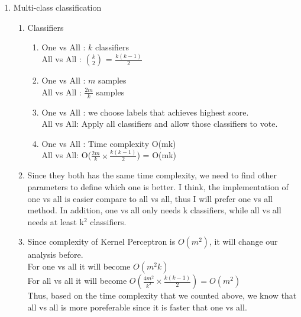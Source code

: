 \documentclass{article}
\begin{document}
\begin{enumerate}
\begin{enumerate}
\begin{center}
\begin{tabular}{|c|c||c|c|c|c||c|c|c|c|}
                                                                                                                                      {\em 10} & $+$ & $0.1$ & $+$ & $+$ & $+$ & $0.0625$ & $-$ & $-$ & $-$ \\
                                                                                                                                            \hline
                                                                                                                                            \end{tabular}
      \end{center}
\end{enumerate}


\item Multi-class classification
\begin{enumerate}
    \item Classifiers
    \begin{enumerate}
        \item One vs All : $k$ classifiers
        \\ All vs All : $\binom{k}{2}$ = $\frac{k(k-1)}{2}$
        \item One vs All : $m$ samples
        \\ All vs All : $\frac{2m}{k}$ samples
        \item  One vs All : we choose labels that achieves highest score.
        \\ All vs All: Apply all classifiers and allow those classifiers to vote. 
        \item One vs All : Time complexity O(mk)
        \\ All vs All: O($\frac{2m}{k} \times \frac{k(k-1)}{2}$) = O(mk)
    \end{enumerate}
   \item Since they both has the same time complexity, we need to find other parameters to define which one is better. I think, the implementation of one vs all is easier compare to all vs all, thus I will prefer one vs all method. In addition, one vs all only needs k classifiers, while all vs all needs at least k$^2$ classifiers.
   \item Since complexity of Kernel Perceptron is $O(m^2)$, it will change our analysis before. 
   \\For one vs all it will become $O(m^2k)$
   \\For all vs all it will become $O(\frac{4m^2}{k^2} \times \frac{k(k-1)}{2}) = O(m^2)$  
   \\Thus, based on the time complexity that we counted above, we know that all vs all is more poreferable since it is faster that one vs all.

\end{enumerate}
\end{enumerate}
\end{document}
